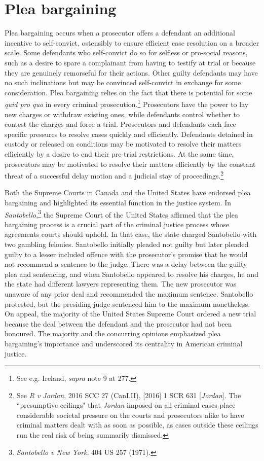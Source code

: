 \section{Plea bargaining}

Plea bargaining occurs when a prosecutor offers a defendant an additional incentive to self-convict, ostensibly to ensure efficient case resolution on a broader scale. Some defendants who self-convict do so for selfless or pro-social reasons, such as a desire to spare a complainant from having to testify at trial or because they are genuinely remorseful for their actions. Other guilty defendants may have no such inclinations but may be convinced self-convict in exchange for some consideration. Plea bargaining relies on the fact that there is potential for some \textit{quid pro quo} in every criminal prosecution.\footnote{See e.g. Ireland, \textit{supra} note 9 at 277.} Prosecutors have the power to lay new charges or withdraw existing ones, while defendants control whether to contest the charges and force a trial. Prosecutors and defendants each face specific pressures to resolve cases quickly and efficiently. Defendants detained in custody or released on conditions may be motivated to resolve their matters efficiently by a desire to end their pre-trial restrictions. At the same time, prosecutors may be motivated to resolve their matters efficiently by the constant threat of a successful delay motion and a judicial stay of proceedings.\footnote{See \textit{R v Jordan}, 2016 SCC 27 (CanLII), [2016] 1 SCR 631 [\textit{Jordan}]. The ``presumptive ceilings" that \textit{Jordan} imposed on all criminal cases place considerable societal pressure on the courts and prosecutors alike to have criminal matters dealt with as soon as possible, as cases outside these ceilings run the real risk of being summarily dismissed.}

Both the Supreme Courts in Canada and the United States have endorsed plea bargaining and highlighted its essential function in the justice system. In \textit{Santobello},\footnote{\textit{Santobello v New York}, 404 US 257 (1971).} the Supreme Court of the United States affirmed that the plea bargaining process is a crucial part of the criminal justice process whose agreements courts should uphold. In that case, the state charged Santobello with two gambling felonies. Santobello initially pleaded not guilty but later pleaded guilty to a lesser included offence with the prosecutor's promise that he would not recommend a sentence to the judge. There was a delay between the guilty plea and sentencing, and when Santobello appeared to resolve his charges, he and the state had different lawyers representing them. The new prosecutor was unaware of any prior deal and recommended the maximum sentence. Santobello protested, but the presiding judge sentenced him to the maximum nonetheless. On appeal, the majority of the United States Supreme Court ordered a new trial because the deal between the defendant and the prosecutor had not been honoured. The majority and the concurring opinions emphasized plea bargaining's importance and underscored its centrality in American criminal justice.

